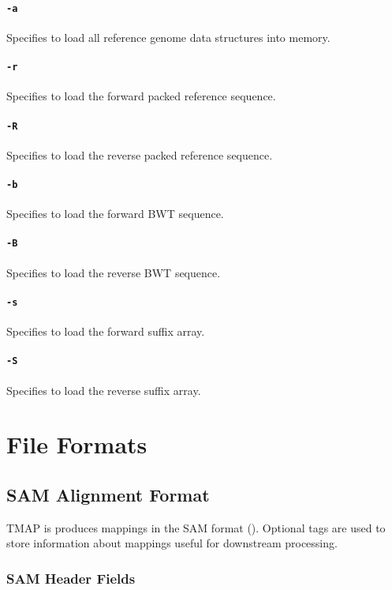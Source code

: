 \documentclass[a4paper,12pt]{book}
\newcommand{\TT}[1]{{\tt #1}} %
\begin{document}
\subsubsection{\TT{-a}}
Specifies to load all reference genome data structures into memory.

\subsubsection{\TT{-r}}
Specifies to load the forward packed reference sequence.

\subsubsection{\TT{-R}}
Specifies to load the reverse packed reference sequence.

\subsubsection{\TT{-b}}
Specifies to load the forward BWT sequence.

\subsubsection{\TT{-B}}
Specifies to load the reverse BWT sequence.

\subsubsection{\TT{-s}}
Specifies to load the forward suffix array.

\subsubsection{\TT{-S}}
Specifies to load the reverse suffix array.

\chapter{File Formats}

\section{SAM Alignment Format}
TMAP is produces mappings in the SAM format (\cite{SAM-format}).
Optional tags are used to store information about mappings useful for downstream processing.

\subsection{SAM Header Fields}
\end{document}
